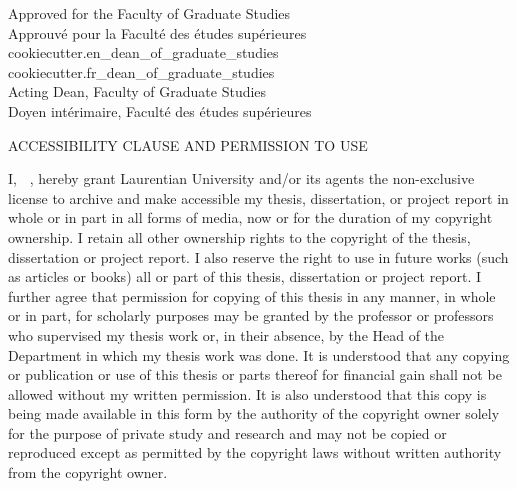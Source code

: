 \begin{minipage}[c]{0.5\textwidth}
    \vspace{2em}
    Approved for the Faculty of Graduate Studies \\
    Approuv\'e pour la Facult\'e des \'etudes sup\'erieures \\
    {{cookiecutter.en_dean_of_graduate_studies}} \\
    {{cookiecutter.fr_dean_of_graduate_studies}} \\
    Acting Dean, Faculty of Graduate Studies \\
    Doyen int\'erimaire, Facult\'e des \'etudes sup\'erieures\\
    \vspace{2em}
\end{minipage}
\vspace{-\parskip}
\begin{center}
    \normalsize
    ACCESSIBILITY CLAUSE AND PERMISSION TO USE \\
\end{center}
\vspace{-\parskip}
I, \textbf{\givenname\ \surname}, hereby grant Laurentian University and/or its agents the non-exclusive license to archive and make accessible my thesis, dissertation, or project report in whole or in part in all forms of media, now or for the duration of my copyright ownership.
I retain all other ownership rights to the copyright of the thesis, dissertation or project report.
I also reserve the right to use in future works (such as articles or books) all or part of this thesis, dissertation or project report.
I further agree that permission for copying of this thesis in any manner, in whole or in part, for scholarly purposes may be granted by the professor or professors who supervised my thesis work or, in their absence, by the Head of the Department in which my thesis work was done.
It is understood that any copying or publication or use of this thesis or parts thereof for financial gain shall not be allowed without my written permission.
It is also understood that this copy is being made available in this form by the authority of the copyright owner solely for the purpose of private study and research and may not be copied or reproduced except as permitted by the copyright laws without written authority from the copyright owner.

\normalsize